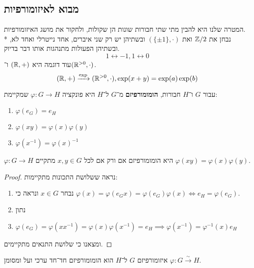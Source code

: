 \subsection{מבוא לאיזומורפיות}
המטרה שלנו היא להבין מתי שתי חבורות שונות הן שקולות, ולחקור את מושג האיזומורפיות. \\*
נבחן את $\mathbb{Z}/2$ ואת $(\{\pm 1\}, \cdot)$ ובשתיהן יש רק שני איברים, אחד נייטרלי ואחד לא, ובשתיהן הפעולות מתנהגות אותו דבר בדיוק.
\[
	1 \leftrightarrow -1,
	1 \leftrightarrow 0
\]
עוד דוגמה היא $(\mathbb{R}, +)$ ו־$(\mathbb{R}^{>0}, \cdot)$.
\[
	(\mathbb{R}, +) \xrightarrow{\exp} (\mathbb{R}^{>0}, \cdot), \exp(x + y) = \exp(a) \exp(b)
\]
\begin{definition}[הומומורפיזם]
	עבור $G$ ו־$H$ חבורות,
	\textbf{הומומורפיזם} מ־$G$ ל־$H$ היא פונקציה $\varphi : G \to H$ שמקיימת:
	\begin{enumerate}
		\item $\varphi(e_G) = e_H$
		\item $\varphi(x y) = \varphi(x) \varphi(y)$
		\item $\varphi(x^{-1}) = {\varphi(x)}^{-1}$
	\end{enumerate}
\end{definition}
\begin{lemma}
	$\varphi : G \to H$ היא הומומורפיזם אם ורק אם לכל $x, y \in G$ מתקיים $\varphi(xy) = \varphi(x) \varphi(y)$.
\end{lemma}
\begin{proof}
	נראה ששלושת התכונות מתקיימות:
	\begin{enumerate}
		\item נבחר $x \in G$ ונראה כי $\varphi(x) = \varphi(e_G x) = \varphi(e_G) \varphi(x) \iff e_H = \varphi(e_G)$.
		\item נתון
		\item $\varphi(e_G) = \varphi(x x^{-1}) = \varphi(x) \varphi(x^{-1}) = e_H \implies \varphi(x^{-1}) = \varphi^{-1}(x) e_H$
	\end{enumerate}
	ומצאנו כי שלושת התנאים מתקיימים.
\end{proof}

\begin{definition}[איזומורפיזם]
	איזומורפיזם $G$ ל־$H$ הוא הומומורפיזם חד־חד ערכי ועל ומסומן $\varphi : G \xrightarrow{\sim} H$.
\end{definition}

